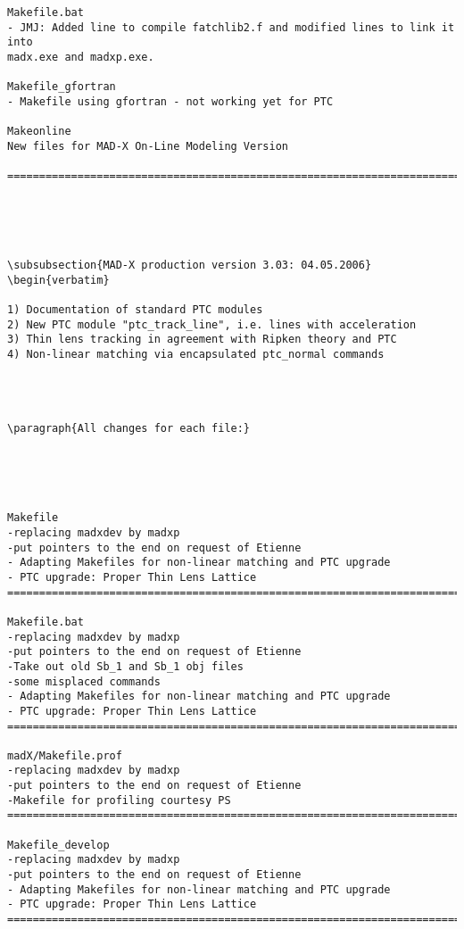 \begin{verbatim}
Makefile.bat
- JMJ: Added line to compile fatchlib2.f and modified lines to link it into 
madx.exe and madxp.exe.

Makefile_gfortran
- Makefile using gfortran - not working yet for PTC

Makeonline
New files for MAD-X On-Line Modeling Version

=============================================================================





\subsubsection{MAD-X production version 3.03: 04.05.2006}
\begin{verbatim}

1) Documentation of standard PTC modules
2) New PTC module "ptc_track_line", i.e. lines with acceleration
3) Thin lens tracking in agreement with Ripken theory and PTC
4) Non-linear matching via encapsulated ptc_normal commands




\paragraph{All changes for each file:}





Makefile
-replacing madxdev by madxp
-put pointers to the end on request of Etienne
- Adapting Makefiles for non-linear matching and PTC upgrade
- PTC upgrade: Proper Thin Lens Lattice
=============================================================================

Makefile.bat
-replacing madxdev by madxp
-put pointers to the end on request of Etienne
-Take out old Sb_1 and Sb_1 obj files
-some misplaced commands
- Adapting Makefiles for non-linear matching and PTC upgrade
- PTC upgrade: Proper Thin Lens Lattice
=============================================================================

madX/Makefile.prof
-replacing madxdev by madxp
-put pointers to the end on request of Etienne
-Makefile for profiling courtesy PS
=============================================================================

Makefile_develop
-replacing madxdev by madxp
-put pointers to the end on request of Etienne
- Adapting Makefiles for non-linear matching and PTC upgrade
- PTC upgrade: Proper Thin Lens Lattice
=============================================================================


\end{verbatim}
